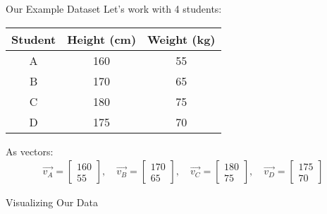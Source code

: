 \documentclass[aspectratio=169]{beamer}
\begin{document}
\begin{frame}{Our Example Dataset}
Let's work with 4 students:

\begin{center}
\begin{tabular}{|c|c|c|}
\hline
Student & Height (cm) & Weight (kg) \\
\hline
A & 160 & 55 \\
B & 170 & 65 \\
C & 180 & 75 \\
D & 175 & 70 \\
\hline
\end{tabular}
\end{center}

\vspace{1em}
As vectors:
\begin{align}
\vec{v_A} = \begin{bmatrix} 160 \\ 55 \end{bmatrix}, \quad 
\vec{v_B} = \begin{bmatrix} 170 \\ 65 \end{bmatrix}, \quad 
\vec{v_C} = \begin{bmatrix} 180 \\ 75 \end{bmatrix}, \quad 
\vec{v_D} = \begin{bmatrix} 175 \\ 70 \end{bmatrix}
\end{align}
\end{frame}

\begin{frame}{Visualizing Our Data}
\begin{center}
\end{center}
\end{frame}
\end{document}
